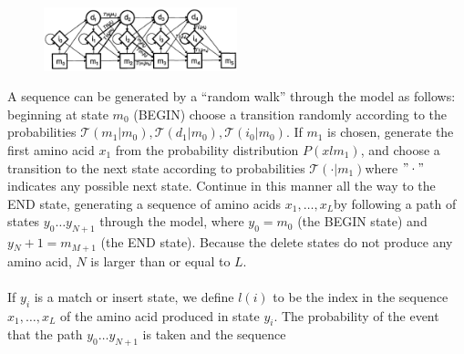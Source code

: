 \begin{figure}[ht]
		\centering
		\includegraphics[width=0.5\textwidth]{HMM}
		\caption{\label{fig:HMM}}
	\end{figure}
\noindent
A sequence can be generated by a “random walk” through the model as follows: beginning at state $m_0$ (BEGIN) choose a transition  randomly according to the probabilities $\mathcal{T}(m_1|m_0),\mathcal{T}(d_1|m_0),\mathcal{T}(i_0|m_0)$. If $m_1$ is chosen, generate the first amino acid $x_1$ from the probability distribution $P(xlm_1)$, and choose a transition to the next state according to probabilities $\mathcal{T}(\cdot |m_1)$where $"\cdot"$ indicates any possible next state. Continue in this manner all the way to the END state, generating a sequence of amino acids $x_1, \dots, x_L$by following a path of states $y_0 \dots y_{N+1}$ through the model, where $y_0 = m_0$ (the BEGIN state) and $y{_N+1}=m_{M+1}$ (the END state). Because the delete states do not produce any amino acid, $N$ is larger than or equal to $L$.
\\
\\
\noindent
If $y_i$ is a match or insert state, we define $l(i)$ to be the index in the sequence $x_1, \dots, x_L$ of the amino acid produced in state $y_i$. The probability of the event that the path $y_{0} \dots y_{N+1}$ is taken and the sequence

